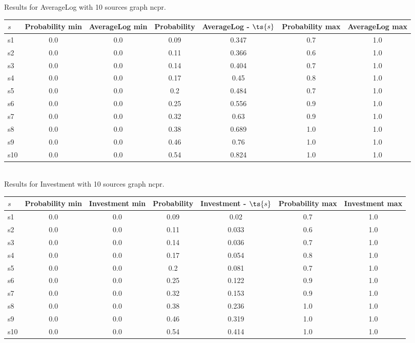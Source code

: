 \documentclass{article}
\begin{document}
\noindent Results for AverageLog with 10 sources graph ncpr.

\noindent\begin{tabular}{|l|c|c|c|c|c|c|}
\hline
$s$& Probability min & AverageLog min & Probability & AverageLog - $\ts{s}$ & Probability max & AverageLog max\\
\hline
s1 &0.0 & 0.0 & 0.09 & 0.347 & 0.7 & 1.0\\
\hline
s2 &0.0 & 0.0 & 0.11 & 0.366 & 0.6 & 1.0\\
\hline
s3 &0.0 & 0.0 & 0.14 & 0.404 & 0.7 & 1.0\\
\hline
s4 &0.0 & 0.0 & 0.17 & 0.45 & 0.8 & 1.0\\
\hline
s5 &0.0 & 0.0 & 0.2 & 0.484 & 0.7 & 1.0\\
\hline
s6 &0.0 & 0.0 & 0.25 & 0.556 & 0.9 & 1.0\\
\hline
s7 &0.0 & 0.0 & 0.32 & 0.63 & 0.9 & 1.0\\
\hline
s8 &0.0 & 0.0 & 0.38 & 0.689 & 1.0 & 1.0\\
\hline
s9 &0.0 & 0.0 & 0.46 & 0.76 & 1.0 & 1.0\\
\hline
s10 &0.0 & 0.0 & 0.54 & 0.824 & 1.0 & 1.0\\
\hline
\end{tabular}\\

\noindent Results for Investment with 10 sources graph ncpr.

\noindent\begin{tabular}{|l|c|c|c|c|c|c|}
\hline
$s$& Probability min & Investment min & Probability & Investment - $\ts{s}$ & Probability max & Investment max\\
\hline
s1 &0.0 & 0.0 & 0.09 & 0.02 & 0.7 & 1.0\\
\hline
s2 &0.0 & 0.0 & 0.11 & 0.033 & 0.6 & 1.0\\
\hline
s3 &0.0 & 0.0 & 0.14 & 0.036 & 0.7 & 1.0\\
\hline
s4 &0.0 & 0.0 & 0.17 & 0.054 & 0.8 & 1.0\\
\hline
s5 &0.0 & 0.0 & 0.2 & 0.081 & 0.7 & 1.0\\
\hline
s6 &0.0 & 0.0 & 0.25 & 0.122 & 0.9 & 1.0\\
\hline
s7 &0.0 & 0.0 & 0.32 & 0.153 & 0.9 & 1.0\\
\hline
s8 &0.0 & 0.0 & 0.38 & 0.236 & 1.0 & 1.0\\
\hline
s9 &0.0 & 0.0 & 0.46 & 0.319 & 1.0 & 1.0\\
\hline
s10 &0.0 & 0.0 & 0.54 & 0.414 & 1.0 & 1.0\\
\hline
\end{tabular}\\
\end{document}
